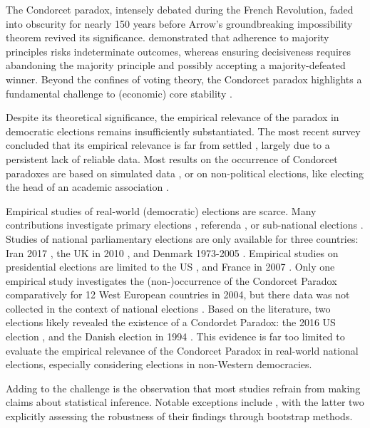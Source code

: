 \documentclass[12pt]{scrartcl}
\begin{document}
The Condorcet paradox, intensely debated during the French Revolution, faded into obscurity for nearly 150 years \citep[][p.~99]{Rothschild2005, McLean2019} before Arrow’s groundbreaking impossibility theorem revived its significance. \citet{Arrow1950} demonstrated that adherence to majority principles risks indeterminate outcomes, whereas ensuring decisiveness requires abandoning the majority principle and possibly accepting a majority-defeated winner. Beyond the confines of voting theory, the Condorcet paradox highlights a fundamental challenge to (economic) core stability \citep{Moulin2014}.

Despite its theoretical significance, the empirical relevance of the paradox in democratic elections remains insufficiently substantiated. The most recent survey concluded that its empirical relevance is far from settled \citep{VanDeemen2013}, largely due to a persistent lack of reliable data. Most results on the occurrence of Condorcet paradoxes are based on simulated data \citep{Lepelley2001, Gehrlein2006, Sauermann2022}, or on non-political elections, like electing the head of an academic association \citep{Chamberlin1984, Feld1992, Regenwetter2007, Tideman2009, Popov2014}.

Empirical studies of real-world (democratic) elections are scarce. Many contributions investigate primary elections \citep{Kurrild2018}, referenda \citep{Bochsler2010, Justesen2007},  or sub-national elections \citep{Munkoe2014, Darmann2023}.  Studies of national parliamentary elections are only available for three countries: Iran 2017 \citep{Feizi2020}, the UK in 2010 \citep{Abramson2013}, and Denmark  1973-2005 \citep{vanDeemen1998, KurrildKlitgaard2001, KurrildKlitgaard2008}. Empirical studies on presidential elections are limited to the US  \citep{Riker1988, Abramson1995, Potthoff2021}, and France in 2007 \citep{Abramson2007}. Only one empirical study investigates the (non-)occurrence of the Condorcet Paradox comparatively for 12 West European countries in 2004,  but there  data was not collected in the context of national elections \citep{McDonald2012}. Based on the literature, two elections likely revealed the existence of a Condordet Paradox: the 2016 US election \citep{Potthoff2021}, and the Danish election in 1994 \citep{KurrildKlitgaard2008}.  This  evidence is far too limited to evaluate the empirical relevance of the Condorcet Paradox in real-world national elections,  especially considering elections in non-Western democracies.  

Adding to the challenge is the observation that most studies refrain from making claims about statistical inference. Notable exceptions include \cite{Potthoff2021, Desai2025, Regenwetter2007, Darmann2019}, with the latter two explicitly assessing the robustness of their findings through bootstrap methods.
\end{document}
